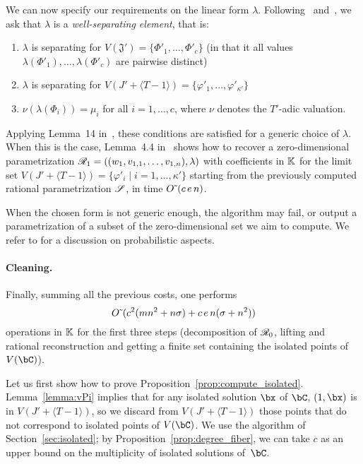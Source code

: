 \documentclass[12pt]{article}
\begin{document}
We can now specify our requirements on the linear form $\lambda$.
Following~\cite{RRS} and~\cite{SaSc16}, we ask that $\lambda$ is a
{\em well-separating element}, that is:
\begin{enumerate}
\item $\lambda$ is separating for $V(\mathfrak{J}')=\{\Phi'_1,\dots,\Phi'_c\}$ (in that it 
all values $\lambda(\Phi'_1),\dots,\lambda(\Phi'_c)$ are pairwise distinct)
\item $\lambda$ is separating for $V(J' + \langle T-1\rangle) = \{ \varphi'_1,\dots,\varphi'_{\kappa'}\}$
\item $\nu(\lambda(\Phi_i)) = \mu_i$ for all $i=1,\dots,c$, where $\nu$ denotes the $T'$-adic valuation.
\end{enumerate}
Applying Lemma~14 in~\cite[Section 3]{SaSc16}, these conditions are
satisfied for a generic choice of $\lambda$. When this is the case,
Lemma~4.4 in~\cite{RRS} shows how to recover a zero-dimensional
parametrization $\mathscr{R}_1=((w_1,v_{1,1},\dots,v_{1,n}),\lambda)$ with
coefficients in $\mathbb{K}$ for the limit set
$V(J' + \langle T-1\rangle) =\{\varphi'_i \mid i=1,\dots,{\kappa'}\}$
starting from the previously computed rational parametrization
$\mathscr{S}$, in time ${O}{\,\tilde{ }\,}(c\,e\,n)$.

When the chosen form is not generic enough, the algorithm may fail, or
output a parametrization of a subset of the zero-dimensional set we
aim to compute. We refer to \cite[Remark 14]{SaSc16} for a discussion
on probabilistic aspects.

\paragraph{Cleaning.}
Finally, summing all the previous costs, one performs
$$
{O}{\,\tilde{ }\,}(c^2 (mn^2+n\sigma) + c\, e\,n (\sigma+n^2) )
$$
operations in $\mathbb{K}$ for the first three steps (decomposition of
$\mathscr{R}_0$, lifting and rational reconstruction and getting a finite
set containing the isolated points of $V(\bC)$).

Let us first show how to prove
Proposition~\ref{prop:compute_isolated}.  Lemma~\ref{lemma:vPi}
implies that for any isolated solution $\bx$ of $\bC$, $(1,\bx)$ is in
$V(J' + \langle T-1\rangle)$, so we discard from $V(J' + \langle
T-1\rangle)$ those points that do not correspond to isolated points of
$V(\bC)$. We use the algorithm of Section~\ref{sec:isolated}; by
Proposition~\ref{prop:degree_fiber}, we can take $c$ as an upper bound
on the multiplicity of isolated solutions of~$\bC$.
\end{document}
